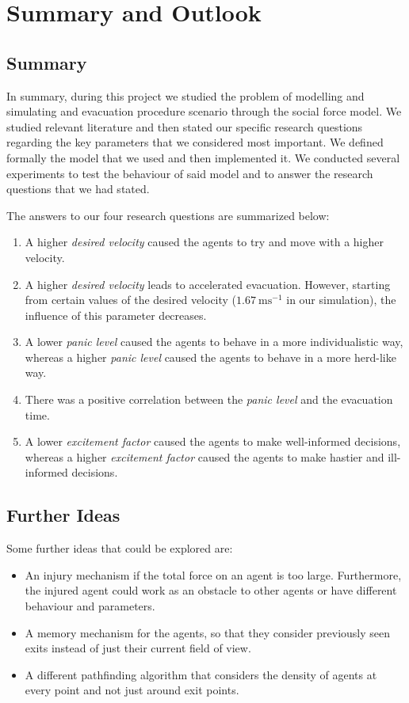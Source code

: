\section{Summary and Outlook} \label{sec:7-summary}
\subsection{Summary}
In summary, during this project we studied the problem of modelling and simulating and evacuation procedure scenario through the social force model. We studied relevant literature and then stated our specific research questions regarding the key parameters that we considered most important. We defined formally the model that we used and then implemented it. We conducted several experiments to test the behaviour of said model and to answer the research questions that we had stated.

The answers to our four research questions are summarized below:
\begin{enumerate}
	\item A higher \emph{desired velocity} caused the agents to try and move with a higher velocity.
	
	\item A higher \emph{desired velocity} leads to accelerated evacuation. However, starting from certain values of the desired velocity ($\SI{1.67}{\meter\second^{-1}}$ in our simulation), the influence of this parameter decreases.
	
	\item A lower \emph{panic level} caused the agents to behave in a more individualistic way, whereas a higher \emph{panic level} caused the agents to behave in a more herd-like way.
	
	\item There was a positive correlation between the \emph{panic level} and the evacuation time.
	
	\item A lower \emph{excitement factor} caused the agents to make well-informed decisions, whereas a higher \emph{excitement factor} caused the agents to make hastier and ill-informed decisions.
\end{enumerate}

\subsection{Further Ideas}
Some further ideas that could be explored are:
\begin{itemize}
	\item An injury mechanism if the total force on an agent is too large. Furthermore, the injured agent could work as an obstacle to other agents or have different behaviour and parameters.
	
	\item A memory mechanism for the agents, so that they consider previously seen exits instead of just their current field of view.
	
	\item A different pathfinding algorithm that considers the density of agents at every point and not just around exit points.
\end{itemize}
